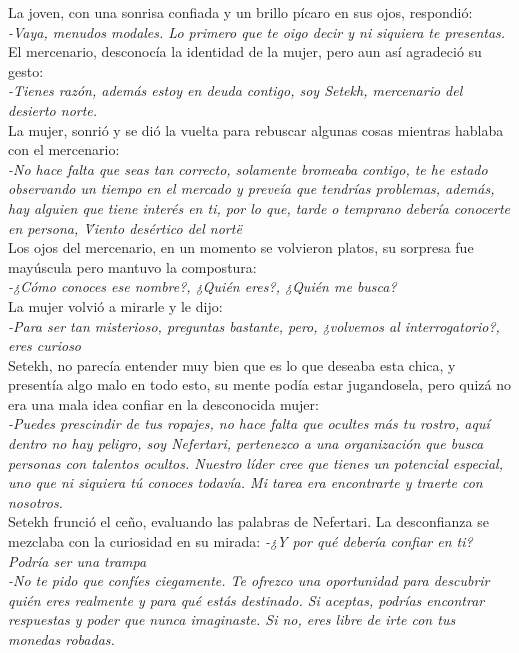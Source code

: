 La joven, con una sonrisa confiada y un brillo pícaro en sus ojos, respondió:\\
\textit{-Vaya, menudos modales. Lo primero que te oigo decir y ni siquiera te presentas.} \\
El mercenario, desconocía la identidad de la mujer, pero aun así agradeció su gesto:\\
\textit{-Tienes razón, además estoy en deuda contigo, soy Setekh, mercenario del desierto norte.}\\
La mujer, sonrió y se dió la vuelta para rebuscar algunas cosas mientras hablaba con el mercenario:\\
\textit{-No hace falta que seas tan correcto, solamente bromeaba contigo, te he estado observando un tiempo en el mercado y preveía que tendrías problemas, además, hay alguien que tiene interés en ti, por lo que,
tarde o temprano debería conocerte en persona, \"Viento desértico del norte\"}\\
Los ojos del mercenario, en un momento se volvieron platos, su sorpresa fue mayúscula pero mantuvo la compostura:\\
\textit{-¿Cómo conoces ese nombre?, ¿Quién eres?, ¿Quién me busca?}\\
La mujer volvió a mirarle y le dijo:\\
\textit{-Para ser tan misterioso, preguntas bastante, pero, ¿volvemos al interrogatorio?, eres curioso}\\
Setekh, no parecía entender muy bien que es lo que deseaba esta chica, y presentía algo malo en todo esto, su mente podía estar jugandosela, pero quizá no era una mala idea confiar en la desconocida mujer:\\
\textit{-Puedes prescindir de tus ropajes, no hace falta que ocultes más tu rostro, aquí dentro no hay peligro, soy Nefertari, pertenezco a una organización que busca personas con talentos ocultos. Nuestro líder cree que tienes un potencial especial, uno que ni siquiera tú conoces todavía. Mi tarea era encontrarte y traerte con nosotros.}\\
Setekh frunció el ceño, evaluando las palabras de Nefertari. La desconfianza se mezclaba con la curiosidad en su mirada:
\textit{-¿Y por qué debería confiar en ti? Podría ser una trampa}\\
\textit{-No te pido que confíes ciegamente. Te ofrezco una oportunidad para descubrir quién eres realmente y para qué estás destinado. Si aceptas, podrías encontrar respuestas y poder que nunca imaginaste. Si no, eres libre de irte con tus monedas robadas.}\\
